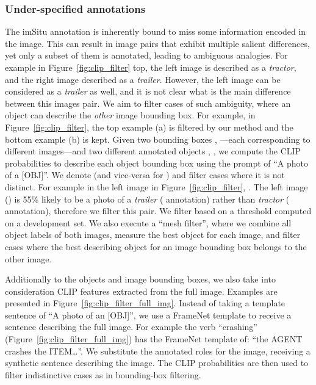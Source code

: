 \documentclass[letterpaper]{article} \usepackage{aaai23}  \usepackage{times}  \usepackage{helvet}  \usepackage{courier}  \usepackage[hyphens]{url}  \usepackage{graphicx} \urlstyle{rm} \def\UrlFont{\rm}  \usepackage{natbib}  \usepackage{caption} \frenchspacing  \setlength{\pdfpagewidth}{8.5in}  \setlength{\pdfpageheight}{11in}  \usepackage{algorithm}
\begin{document}
\subsubsection{Under-specified annotations}
The imSitu annotation is inherently bound to miss some information encoded in the image.
This can result in image pairs  that exhibit multiple salient differences, yet only a subset of them is annotated, leading to ambiguous analogies. For example in Figure~\ref{fig:clip_filter} top, the left image is described as a \emph{tractor}, and the right image described as a \emph{trailer}. However, the left image can be considered as a \emph{trailer} as well, and it is not clear what is the main difference between this images pair.
We aim to filter cases of such ambiguity, where an object can describe the \emph{other} image bounding box. For example, in Figure~\ref{fig:clip_filter}, the top example (a) is filtered by our method and the bottom example (b) is kept. 
Given two bounding boxes , ---each corresponding to different images---and two different annotated objects , , we compute the CLIP \cite{radford2021learning} probabilities to describe each object bounding box using the prompt of ``A photo of a [OBJ]''. We denote   (and vice-versa for ) and filter cases where it is not distinct. For example in the left image in Figure~\ref{fig:clip_filter}, . The left image () is 55\% likely to be a photo of a \emph{trailer} ( annotation) rather than \emph{tractor} ( annotation), therefore we filter this pair. We filter based on a threshold computed on a development set. We also execute a ``mesh filter'', where we combine all object labels of both images, measure the best object for each image, and filter cases where the best describing object for an image bounding box belongs to the other image. 

Additionally to the objects and image bounding boxes, we  also take into consideration CLIP features extracted from the full image. Examples are presented in Figure~\ref{fig:clip_filter_full_img}. Instead of taking a template sentence of ``A photo of an [OBJ]'', we use a FrameNet template \cite{fillmore2003background} to receive a sentence describing the full image. For example the verb ``crashing'' (Figure~\ref{fig:clip_filter_full_img}) has the FrameNet template of: ``the AGENT crashes the ITEM\dots''. We substitute the annotated roles for the image, receiving a synthetic sentence describing the image. The CLIP probabilities are then used to filter indistinctive cases as in bounding-box filtering.
\end{document}
